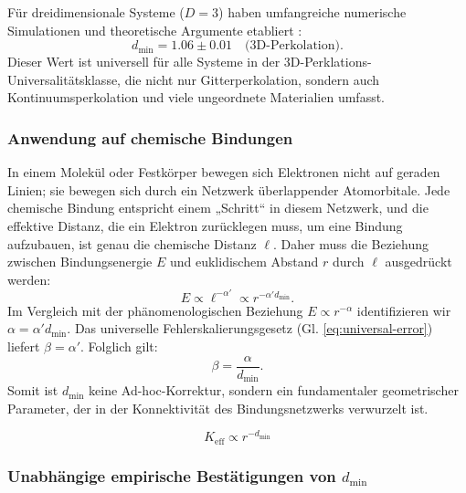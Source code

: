 \documentclass[12pt,a4paper]{article}
\newcommand{\Keff}{K_{\mathrm{eff}}}
\begin{document}
	Für dreidimensionale Systeme (\(D=3\)) haben umfangreiche numerische Simulationen und theoretische Argumente etabliert \cite{Grassberger1999, Stauffer1994}:
	\begin{equation}
		d_{\text{min}} = 1.06 \pm 0.01 \quad \text{(3D-Perkolation)}.
		\label{eq:dmin_3d_percolation}
	\end{equation}
	Dieser Wert ist universell für alle Systeme in der 3D-Perklations-Universalitätsklasse, die nicht nur Gitterperkolation, sondern auch Kontinuumsperkolation und viele ungeordnete Materialien umfasst.
	
	\subsubsection{Anwendung auf chemische Bindungen}
	
	In einem Molekül oder Festkörper bewegen sich Elektronen nicht auf geraden Linien; sie bewegen sich durch ein Netzwerk überlappender Atomorbitale. Jede chemische Bindung entspricht einem „Schritt“ in diesem Netzwerk, und die effektive Distanz, die ein Elektron zurücklegen muss, um eine Bindung aufzubauen, ist genau die chemische Distanz \(\ell\). Daher muss die Beziehung zwischen Bindungsenergie \(E\) und euklidischem Abstand \(r\) durch \(\ell\) ausgedrückt werden:
	\begin{equation}
		E \propto \ell^{-\alpha'} \propto r^{-\alpha' d_{\text{min}}}.
		\label{eq:E_through_chemical_distance}
	\end{equation}
	Im Vergleich mit der phänomenologischen Beziehung \(E \propto r^{-\alpha}\) identifizieren wir \(\alpha = \alpha' d_{\text{min}}\). Das universelle Fehlerskalierungsgesetz (Gl. \ref{eq:universal-error}) liefert \(\beta = \alpha'\). Folglich gilt:
	\begin{equation}
		\beta = \frac{\alpha}{d_{\text{min}}}.
		\label{eq:beta_from_alpha}
	\end{equation}
	Somit ist \(d_{\text{min}}\) keine Ad-hoc-Korrektur, sondern ein fundamentaler geometrischer Parameter, der in der Konnektivität des Bindungsnetzwerks verwurzelt ist.
	
	\begin{equation}
		\Keff \propto r^{-d_{\text{min}}}
		\label{eq:keff-scaling}
	\end{equation}
	
	\subsubsection{Unabhängige empirische Bestätigungen von \(d_{\text{min}}\)}
	
\end{document}
